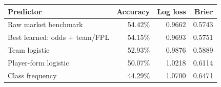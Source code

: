 \begin{tabularx}{\linewidth}{@{}Yrrr@{}}
\toprule
Predictor & Accuracy & Log loss & Brier \\

\midrule
Raw market benchmark & 54.42\% & 0.9662 & 0.5743 \\
Best learned: odds + team/FPL & 54.15\% & 0.9693 & 0.5751 \\
Team logistic & 52.93\% & 0.9876 & 0.5889 \\
Player-form logistic & 50.07\% & 1.0218 & 0.6114 \\
Class frequency & 44.29\% & 1.0700 & 0.6471 \\
\bottomrule
\end{tabularx}
